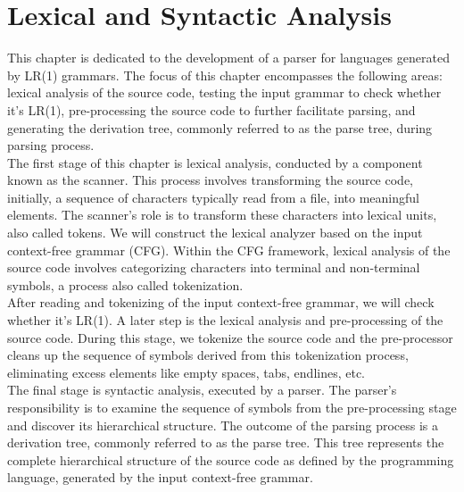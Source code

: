 \chapter{Lexical and Syntactic Analysis}\label{ch:Lexical and Syntactic Analysis}

This chapter is dedicated to the development of a parser for languages generated by LR(1) grammars. The focus of this chapter encompasses the following areas: lexical analysis of the source code, testing the input grammar to check whether it's LR(1), pre-processing the source code to further facilitate parsing, and generating the derivation tree, commonly referred to as the parse tree, during parsing process.\\

The first stage of this chapter is lexical analysis, conducted by a component known as the scanner. This process involves transforming the source code, initially, a sequence of characters typically read from a file, into meaningful elements. The scanner's role is to transform these characters into lexical units, also called tokens. We will construct the lexical analyzer based on the input context-free grammar (CFG). Within the CFG framework, lexical analysis of the source code involves categorizing characters into terminal and non-terminal symbols, a process also called tokenization.\\

After reading and tokenizing of the input context-free grammar, we will check whether it's LR(1). A later step is the lexical analysis and pre-processing of the source code. During this stage, we tokenize the source code and the pre-processor cleans up the sequence of symbols derived from this tokenization process, eliminating excess elements like empty spaces, tabs, endlines, etc.\\

The final stage is syntactic analysis, executed by a parser. The parser's responsibility is to examine the sequence of symbols from the pre-processing stage and discover its hierarchical structure. The outcome of the parsing process is a derivation tree, commonly referred to as the parse tree. This tree represents the complete hierarchical structure of the source code as defined by the programming language, generated by the input context-free grammar.\\

